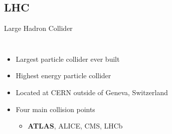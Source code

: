 \documentclass[aspectratio=169,xcolor=table]{beamer}
\begin{document}
  \subsection{LHC }

    \begin{frame}[t]{Large Hadron Collider}
      \begin{columns}[t]
          \begin{itemize}
            \item Largest particle collider ever built
            \item Highest energy particle collider
            \item Located at CERN outside of Geneva, Switzerland
            \item Four main collision points
            \begin{itemize}
              \item \textbf{ATLAS}, ALICE, CMS, LHCb
            \end{itemize}
          \end{itemize}
          \centering


\end{columns}
\end{frame}
\end{document}
